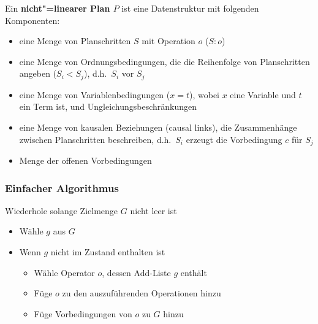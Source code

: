 Ein \textbf{nicht"=linearer Plan $P$} ist eine Datenstruktur mit folgenden Komponenten:
\begin{itemize}
	\item eine Menge von Planschritten $S$ mit Operation $o$ ($S:o$)
	\item eine Menge von Ordnungsbedingungen, die die Reihenfolge von Planschritten angeben ($S_i < S_j$), d.h.\ \glqq $S_i$ vor $S_j$ \grqq
	\item eine Menge von Variablenbedingungen ($x=t$), wobei $x$ eine Variable und $t$ ein Term ist, und Ungleichungsbeschränkungen
	\item eine Menge von kausalen Beziehungen (causal links), die Zusammenhänge zwischen Planschritten beschreiben, d.h.\ $S_i$ erzeugt die Vorbedingung $c$ für $S_j$
	\item Menge der offenen Vorbedingungen
\end{itemize}

\subsubsection{Einfacher Algorithmus}
Wiederhole solange Zielmenge $G$ nicht leer ist
\begin{itemize}
	\item Wähle $g$ aus $G$
	\item Wenn $g$ nicht im Zustand enthalten ist
	\begin{itemize}
		\item Wähle Operator $o$, dessen Add-Liste $g$ enthält
		\item Füge $o$ zu den auszuführenden Operationen hinzu
		\item Füge Vorbedingungen von $o$ zu $G$ hinzu
	\end{itemize}
\end{itemize}

